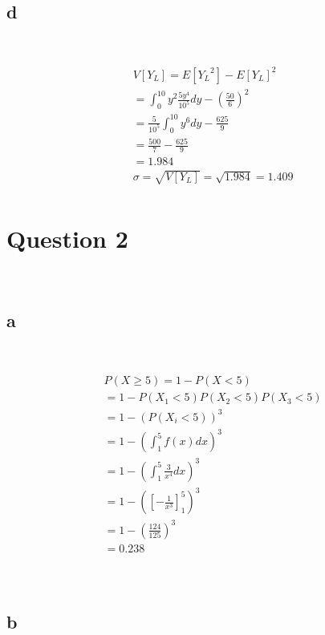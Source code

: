 \documentclass{article}
\begin{document}
~

\subsection*{d}

~

\begin{align*}
    &V[Y_L]=E[{Y_L}^2]-E[Y_L]^2\\
    &=\int_{0}^{10}y^2\frac{5y^4}{10^5}dy-(\frac{50}{6})^2\\
    &=\frac{5}{10^5}\int_{0}^{10}y^6dy-\frac{625}{9}\\
    &=\frac{500}{7}-\frac{625}{9}\\
    &=1.984\\
    &\sigma=\sqrt{V[Y_L]}=\sqrt{1.984}=1.409\\
\end{align*}

\newpage

\section*{Question 2}

~

\subsection*{a}

~

\begin{align*}
    &P(X\geqslant5)=1-P(X<5)\\
    &=1-P(X_1<5)P(X_2<5)P(X_3<5)\\
    &=1-(P(X_i<5))^3\\
    &=1-(\int_{1}^{5}f(x)dx)^3\\
    &=1-(\int_{1}^{5}\frac{3}{x^4}dx)^3\\
    &=1-(\left[-\frac{1}{x^3}\right]^5_1)^3\\
    &=1-(\frac{124}{125})^3\\
    &=0.238\\
\end{align*}

~

\subsection*{b}

~
\end{document}
